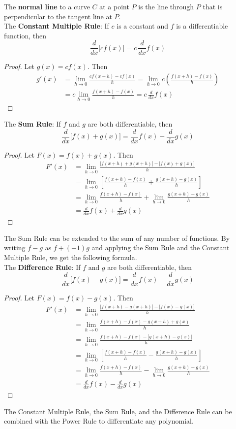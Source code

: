 The \textbf{normal line} to a curve \(C\) at a point \(P\) is the line through
\(P\) that is perpendicular to the tangent line at \(P\). \\
The \textbf{Constant Multiple Rule}:
If \(c\) is a constant and \(f\) is a differentiable function, then
\[\frac{d}{dx}\big[cf(x)\big]=c\,\frac{d}{dx}f(x)\]
\begin{proof}
    Let \(g(x)=cf(x)\).
    Then
    \begin{align*}
        g'(x) &= \lim_{h\to 0}\frac{cf(x+h)-cf(x)}{h}
        =\lim_{h\to 0}c\left(\frac{f(x+h)-f(x)}{h}\right) \\
        &= c\lim_{h\to 0}\frac{f(x+h)-f(x)}{h}
        =c\,\frac{d}{dx}f(x)
    \end{align*}
\end{proof}
The \textbf{Sum Rule}: If \(f\) and \(g\) are both differentiable, then
\[\frac{d}{dx}\big[f(x)+g(x)\big]=\frac{d}{dx}f(x)+\frac{d}{dx}g(x)\]
\begin{proof}
    Let \(F(x)=f(x)+g(x)\).
    Then
    \begin{align*}
        F'(x) &= \lim_{h\to 0}
        \frac{\big[f(x+h)+g(x+h)\big]-\big[f(x)+g(x)\big]}{h} \\
        &= \lim_{h\to 0}
        \left[\frac{f(x+h)-f(x)}{h}+\frac{g(x+h)-g(x)}{h}\right] \\
        &= \lim_{h\to 0}\frac{f(x+h)-f(x)}{h}
        +\lim_{h\to 0}\frac{g(x+h)-g(x)}{h} \\
        &= \frac{d}{dx}f(x)+\frac{d}{dx}g(x)
    \end{align*}
\end{proof}
The Sum Rule can be extended to the sum of any number of functions.
By writing \(f-g\) as \(f+(-1)g\) and applying the Sum Rule and the Constant
Multiple Rule, we get the following formula. \\
The \textbf{Difference Rule}: If \(f\) and \(g\) are both differentiable, then
\[\frac{d}{dx}\big[f(x)-g(x)\big]=\frac{d}{dx}f(x)-\frac{d}{dx}g(x)\]
\begin{proof}
    Let \(F(x)=f(x)-g(x)\).
    Then
    \begin{align*}
        F'(x) &= \lim_{h\to 0}
        \frac{\big[f(x+h)-g(x+h)\big]-\big[f(x)-g(x)\big]}{h} \\
        &= \lim_{h\to 0}\frac{f(x+h)-f(x)-g(x+h)+g(x)}{h} \\
        &= \lim_{h\to 0}\frac{f(x+h)-f(x)-\big[g(x+h)-g(x)\big]}{h} \\
        & =\lim_{h\to 0}
        \left[\frac{f(x+h)-f(x)}{h}-\frac{g(x+h)-g(x)}{h}\right] \\
        &= \lim_{h\to 0}
        \frac{f(x+h)-f(x)}{h}-\lim_{h\to 0}\frac{g(x+h)-g(x)}{h} \\
        &= \frac{d}{dx}f(x)-\frac{d}{dx}g(x)
    \end{align*}
\end{proof}
The Constant Multiple Rule, the Sum Rule, and the Difference Rule can be
combined with the Power Rule to differentiate any polynomial.

